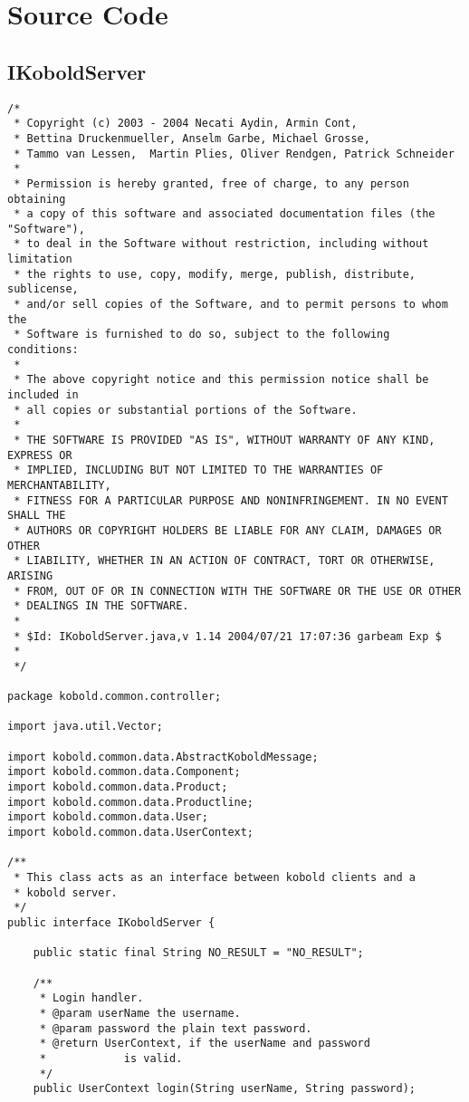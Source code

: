 \chapter{Source Code}
\section{IKoboldServer}
\small \begin{verbatim}
/*
 * Copyright (c) 2003 - 2004 Necati Aydin, Armin Cont, 
 * Bettina Druckenmueller, Anselm Garbe, Michael Grosse, 
 * Tammo van Lessen,  Martin Plies, Oliver Rendgen, Patrick Schneider
 * 
 * Permission is hereby granted, free of charge, to any person obtaining
 * a copy of this software and associated documentation files (the "Software"),
 * to deal in the Software without restriction, including without limitation
 * the rights to use, copy, modify, merge, publish, distribute, sublicense, 
 * and/or sell copies of the Software, and to permit persons to whom the 
 * Software is furnished to do so, subject to the following conditions:
 *
 * The above copyright notice and this permission notice shall be included in 
 * all copies or substantial portions of the Software.
 *
 * THE SOFTWARE IS PROVIDED "AS IS", WITHOUT WARRANTY OF ANY KIND, EXPRESS OR 
 * IMPLIED, INCLUDING BUT NOT LIMITED TO THE WARRANTIES OF MERCHANTABILITY, 
 * FITNESS FOR A PARTICULAR PURPOSE AND NONINFRINGEMENT. IN NO EVENT SHALL THE 
 * AUTHORS OR COPYRIGHT HOLDERS BE LIABLE FOR ANY CLAIM, DAMAGES OR OTHER 
 * LIABILITY, WHETHER IN AN ACTION OF CONTRACT, TORT OR OTHERWISE, ARISING 
 * FROM, OUT OF OR IN CONNECTION WITH THE SOFTWARE OR THE USE OR OTHER 
 * DEALINGS IN THE SOFTWARE.
 *
 * $Id: IKoboldServer.java,v 1.14 2004/07/21 17:07:36 garbeam Exp $
 *
 */

package kobold.common.controller;

import java.util.Vector;

import kobold.common.data.AbstractKoboldMessage;
import kobold.common.data.Component;
import kobold.common.data.Product;
import kobold.common.data.Productline;
import kobold.common.data.User;
import kobold.common.data.UserContext;

/**
 * This class acts as an interface between kobold clients and a
 * kobold server.
 */
public interface IKoboldServer {
	
	public static final String NO_RESULT = "NO_RESULT";

	/**
	 * Login handler.
	 * @param userName the username.
	 * @param password the plain text password.
	 * @return UserContext, if the userName and password
	 * 			  is valid. 
	 */
    public UserContext login(String userName, String password);


\end{verbatim}
